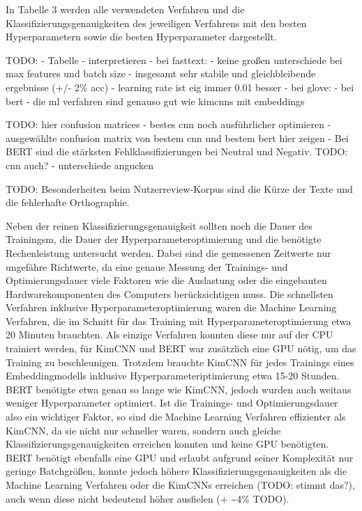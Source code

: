 \documentclass[11pt]{article}
\begin{document}
    In Tabelle 3 werden alle verwendeten Verfahren und die
Klassifizierungsgenauigkeiten des jeweiligen Verfahrens mit den besten
Hyperparametern sowie die besten Hyperparameter dargestellt.

TODO: - Tabelle - interpretieren - bei fasttext: - keine großen
unterschiede bei max features und batch size - insgesamt sehr stabile
und gleichbleibende ergebnisse (+/- 2\% acc) - learning rate ist eig
immer 0.01 besser - bei glove: - bei bert - die ml verfahren sind
genauso gut wie kimcnns mit embeddings

TODO: hier confusion matrices - bestes cnn noch ausführlicher optimieren
- ausgewählte confusion matrix von bestem cnn und bestem bert hier
zeigen - Bei BERT sind die stärksten Fehlklassifizierungen bei Neutral
und Negativ. TODO: cnn auch? - unterschiede angucken

TODO: Besonderheiten beim Nutzerreview-Korpus sind die Kürze der Texte
und die fehlerhafte Orthographie.

Neben der reinen Klassifizierungsgenauigkeit sollten noch die Dauer des
Trainingsm, die Dauer der Hyperparameteroptimierung und die benötigte
Rechenleistung untersucht werden. Dabei sind die gemessenen Zeitwerte
nur ungefähre Richtwerte, da eine genaue Messung der Trainings- und
Optimierungsdauer viele Faktoren wie die Auslastung oder die eingebauten
Hardwarekomponenten des Computers berücksichtigen muss. Die schnellsten
Verfahren inklusive Hyperparameteroptimierung waren die Machine Learning
Verfahren, die im Schnitt für das Training mit Hyperparameteroptimierung
etwa 20 Minuten brauchten. Als einzige Verfahren konnten diese nur auf
der CPU trainiert werden, für KimCNN und BERT war zusätzlich eine GPU
nötig, um das Training zu beschleunigen. Trotzdem brauchte KimCNN für
jedes Trainings eines Embeddingmodells inklusive
Hyperparameteriptimierung etwa 15-20 Stunden. BERT benötigte etwa genau
so lange wie KimCNN, jedoch wurden auch weitaus weniger Hyperparameter
optimiert. Ist die Trainings- und Optimierungsdauer also ein wichtiger
Faktor, so sind die Machine Learning Verfahren effizienter als KimCNN,
da sie nicht nur schneller waren, sondern auch gleiche
Klassifizierungsgenauigkeiten erreichen konnten und keine GPU
benötigten. BERT benötigt ebenfalls eine GPU und erlaubt aufgrund seiner
Komplexität nur geringe Batchgrößen, konnte jedoch höhere
Klassifizierungsgenauigkeiten als die Machine Learning Verfahren oder
die KimCNNs erreichen (TODO: stimmt das?), auch wenn diese nicht
bedeutend höher ausfielen (+ \textasciitilde4\% TODO).
\end{document}
